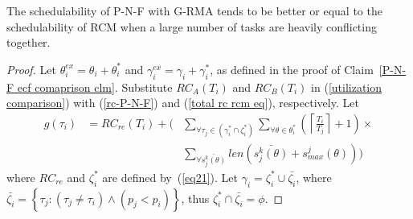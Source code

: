 \begin{clm}
The schedulability of P-N-F with G-RMA tends to be 
better or equal to the schedulability of RCM when a large number of tasks are heavily conflicting together.
\end{clm}
\begin{proof}
Let $\theta_{i}^{ex}=\theta_{i}+\theta_{i}^{*}$ and $\gamma_{i}^{ex}=\gamma_{i}+\gamma_{i}^{*}$, as defined in the proof of Claim~\ref{P-N-F ecf comaprison clm}. Substitute $RC_{A}(T_{i})$ and $RC_{B}(T_{i})$ in (\ref{utilization comparison}) with (\ref{rc-P-N-F}) and (\ref{total rc rcm eq}), respectively.
Let 
% 
\begin{eqnarray*}
g(\tau_{i}) & =RC_{re}(T_{i})+\Bigg( & \sum_{\forall\tau_{j}\in(\gamma_{i}^{*}\cap\zeta_{i}^{*})}\sum_{\forall\theta\in\theta_{i}^{*}}\left(\left\lceil \frac{T_{i}}{T_{j}}\right\rceil +1\right)\times\\
 &  & \sum_{\forall\bar{s_{j}^{k}(\theta)}}len\left(\bar{s_{j}^{k}(\theta)}+s_{max}^{j}(\theta)\right)\Bigg)
\end{eqnarray*}
%
where $RC_{re}$ and $\zeta_i^*$ are defined by~(\ref{eq21}).
Let $\gamma_{i}=\zeta_{i}^{*}\cup\bar{\zeta_{i}}$, where $\bar{\zeta_{i}}=\left\{ \tau_{j}:\left(\tau_{j}\ne\tau_{i}\right)\wedge\left(p_{j}<p_{i}\right)\right\} $,
thus $\zeta_{i}^{*}\cap\bar{\zeta_{i}}=\phi$.


\end{proof}
